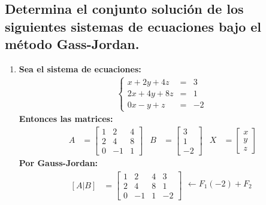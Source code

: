 \documentclass[10pt, a4paper]{article}
\begin{document}
\subsection{Determina el conjunto solución de los siguientes sistemas de ecuaciones bajo el método Gass-Jordan.}
\begin{enumerate}
  \item \textbf{Sea el sistema de ecuaciones:}
  \begin{align*}
    \left\{
    \begin{array}{rcl}
      x+2y+4z &= &3\\
      2x+4y+8z &= &1\\
      0x-y+z &= &-2
    \end{array}
    \right.\
  \end{align*}
  \textbullet\textbf{Entonces las matrices:}
  \begin{align*}
    A &= \begin{bmatrix}
      1 & 2 & 4\\
      2 & 4 & 8\\
      0 & -1 & 1
    \end{bmatrix}&
    B &= \begin{bmatrix}
      3\\
      1\\
      -2
    \end{bmatrix}&
    X &= \begin{bmatrix}
      x\\
      y\\
      z
    \end{bmatrix}
  \end{align*}
  \textbullet\textbf{Por Gauss-Jordan:}
  \begin{align*}
    \left[A|B\right]&=\left[
      \begin{array}{ccc|c}
        1 & 2 & 4 & 3\\
        2 & 4 & 8 & 1\\
        0 & -1 & 1 & -2
      \end{array}
    \right]
    \begin{array}{r}
      \\\\
      \leftarrow F_1\left(-2\right)+F_2\\
      \\\\
    \end{array}
  \end{align*}
  \begin{align*}

\end{align*}
\end{enumerate}
\end{document}
